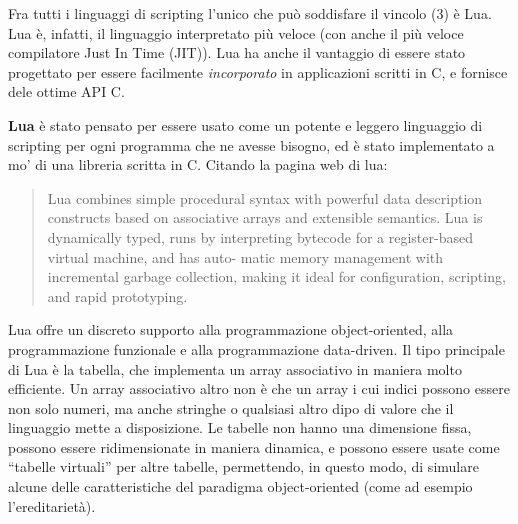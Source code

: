 Fra tutti i linguaggi di scripting l'unico che pu\`o soddisfare il vincolo (3) \`e Lua.
Lua \`e, infatti, il linguaggio interpretato pi\`u veloce (con anche il pi\`u veloce compilatore Just In Time (JIT)).
Lua ha anche il vantaggio di essere stato progettato per essere facilmente \emph{incorporato} in applicazioni scritti in C, e fornisce dele ottime API C.

\textbf{Lua} \`e stato pensato per essere usato come un potente e leggero linguaggio di scripting per ogni programma che ne avesse bisogno, ed \`e stato implementato a mo' di una libreria scritta in C.
Citando la pagina web di lua:

\begin{quote}
Lua combines simple procedural syntax with powerful data description constructs based on associative arrays and extensible semantics. Lua is dynamically typed, runs by interpreting bytecode for a register-based virtual machine, and has auto- matic memory management with incremental garbage collection, making it ideal for configuration, scripting, and rapid prototyping.
\end{quote}

Lua offre un discreto supporto alla programmazione object-oriented, alla programmazione funzionale e alla programmazione data-driven.
Il tipo principale di Lua \`e la tabella, che implementa un array associativo in maniera molto efficiente.
Un array associativo altro non \`e che un array i cui indici possono essere non solo numeri, ma anche stringhe o qualsiasi altro dipo di valore che il linguaggio mette a disposizione.
Le tabelle non hanno una dimensione fissa, possono essere ridimensionate in maniera dinamica, e possono essere usate come ``tabelle virtuali'' per altre tabelle, permettendo, in questo modo, di simulare alcune delle caratteristiche del paradigma object-oriented (come ad esempio l'ereditariet\`a).
